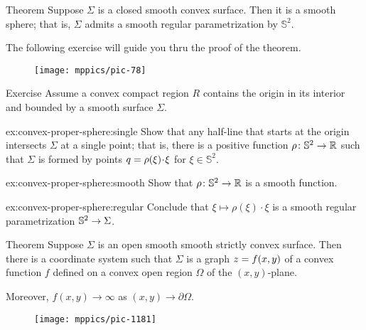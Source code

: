 \begin{thm}{Theorem}\label{thm:convex-closed}
Suppose $\Sigma$ is a closed smooth convex surface.
Then it is a smooth sphere; that is, $\Sigma$ admits a smooth regular parametrization by $\mathbb{S}^2$.\end{thm}

The following exercise will guide you thru the proof of the theorem.

{

\begin{wrapfigure}{r}{33 mm}
\vskip-0mm
\centering
\texttt{[image: mppics/pic-78]}
\end{wrapfigure}

\begin{thm}{Exercise}\label{ex:convex-proper-sphere}
Assume a convex compact region $R$ contains the origin in its interior and bounded by a smooth surface $\Sigma$.

\begin{subthm}{ex:convex-proper-sphere:single}
Show that any half-line that starts at the origin intersects $\Sigma$ at a single point;
that is, there is a positive function $\rho\:\mathbb{S}^2\z\to\RR$ such that $\Sigma$ is formed by points $q\z=\rho(\xi)\cdot \xi$ for $\xi\in \mathbb{S}^2$.
\end{subthm}

\begin{subthm}{ex:convex-proper-sphere:smooth}
Show that $\rho\colon\mathbb{S}^2\to\mathbb{R}$ is a smooth function.
\end{subthm}

\begin{subthm}{ex:convex-proper-sphere:regular}
Conclude that $\xi\mapsto \rho(\xi)\cdot \xi$ is a smooth regular parametrization $\mathbb{S}^2\z\to \Sigma$.
\end{subthm}

\end{thm}

\begin{thm}{Theorem}\label{thm:convex-open}
Suppose $\Sigma$ is an open smooth smooth strictly convex surface.
Then there is a coordinate system such that 
$\Sigma$ is a graph $z\z=f(x,y)$ of a convex function $f$ defined on a convex open region $\Omega$ of the $(x,y)$-plane.

Moreover, $f(x,y)\to\infty$ as $(x,y)\to\partial\Omega$.

\end{thm}

\begin{wrapfigure}{r}{33 mm}
\vskip-8mm
\centering
\texttt{[image: mppics/pic-1181]}
\end{wrapfigure}


}
